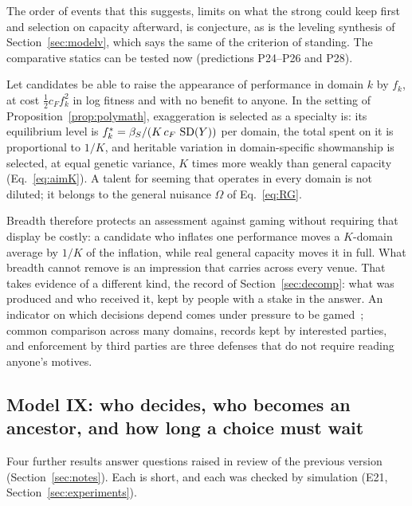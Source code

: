 The order of events that this suggests, limits on what the strong could keep first and selection on capacity afterward, is
conjecture, as is the leveling synthesis of Section~\ref{sec:modelv}, which says the same of the criterion of
standing. The comparative statics can be tested now (predictions P24--P26 and P28).

\begin{corollary}\label{cor:inflation}
Let candidates be able to raise the appearance of performance in domain $k$ by $f_k$, at cost $\tfrac12c_Ff_k^2$ in log
fitness and with no benefit to anyone. In the setting of Proposition~\ref{prop:polymath}, exaggeration is selected as a
specialty is: its equilibrium level is $f_k^*=\beta_S/(K\,c_F\,\operatorname{SD}(Y))$ per domain, the total spent on it is proportional
to $1/K$, and heritable variation in domain-specific showmanship is selected, at equal genetic variance, $K$ times more
weakly than general capacity (Eq.~\ref{eq:aimK}). A talent for seeming that operates in every domain is not diluted; it belongs to the general nuisance
$\Omega$ of Eq.~\eqref{eq:RG}.
\end{corollary}

Breadth therefore protects an assessment against gaming without requiring that display be costly: a candidate who
inflates one performance moves a $K$-domain average by $1/K$ of the inflation, while real general capacity moves it in
full. What breadth cannot remove is an impression that carries across every venue. That takes evidence of a different
kind, the record of Section~\ref{sec:decomp}: what was produced and who received it, kept by people with a stake in the
answer. An indicator on which decisions depend comes under pressure to be
gamed~\cite{campbell1979}; common comparison across many domains, records kept by interested parties, and enforcement by
third parties are three defenses that do not require reading anyone's motives.

\subsection{Model IX: who decides, who becomes an ancestor, and how long a choice must wait}\label{sec:modelix}

Four further results answer questions raised in review of the previous version (Section~\ref{sec:notes}). Each is short,
and each was checked by simulation (E21, Section~\ref{sec:experiments}).

